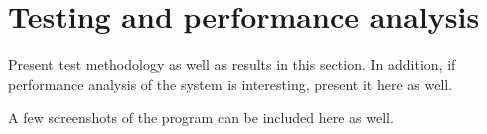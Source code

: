 \chapter{Testing and performance analysis}

Present test methodology as well as results in this section. In addition, if performance analysis of the system is interesting, present it here as well.

A few screenshots of the program can be included here as well.


